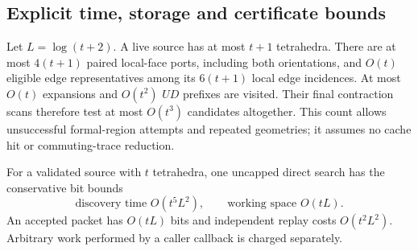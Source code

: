 \subsection{Explicit time, storage and certificate bounds}

Let $L=\log(t+2)$.  A live source has at most $t+1$ tetrahedra.
There are at most $4(t+1)$ paired local-face ports, including both
orientations, and $O(t)$ eligible edge representatives among its
$6(t+1)$ local edge incidences.  At most $O(t)$ expansions and
$O(t^2)$ $UD$ prefixes are visited.  Their final contraction scans
therefore test at most $O(t^3)$ candidates altogether.  This count
allows unsuccessful formal-region attempts and repeated geometries;
it assumes no cache hit or commuting-trace reduction.

\begin{proposition}
\label{prop:geometric-descent-crushing-cost}
For a validated source with $t$ tetrahedra, one uncapped direct search
has the conservative bit bounds
\[
 \text{discovery time }O(t^5L^2),\qquad
 \text{working space }O(tL).
\]
An accepted packet has $O(tL)$ bits and independent replay costs
$O(t^2L^2)$.  Arbitrary work performed by a caller callback is charged
separately.
\end{proposition}
